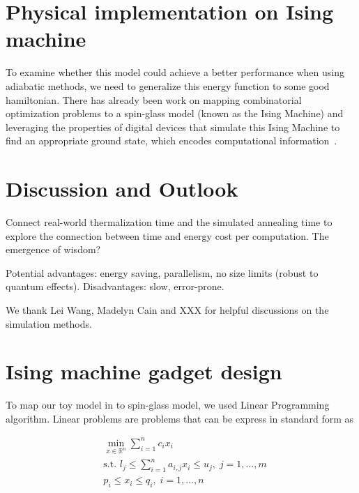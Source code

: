 \documentclass[twocolumn,superscriptaddress,english,showpacs,longbibliography]{revtex4-2}
\begin{document}
\section{Physical implementation on Ising machine}\label{spin-glass}

To examine whether this model could achieve a better performance when
using adiabatic methods, we need to generalize this energy function to
some good hamiltonian. There has already been work on mapping
combinatorial optimization problems to a spin-glass model (known as the
Ising Machine) and leveraging the properties of digital devices that
simulate this Ising Machine to find an appropriate ground state, which
encodes computational information~\cite{Aadit2022,Bybee2023}.



\section{Discussion and Outlook}
Connect real-world thermalization time and the simulated annealing time to explore the connection between time and energy cost per computation.
The emergence of wisdom?

Potential advantages: energy saving, parallelism, no size limits (robust to quantum effects). Disadvantages: slow, error-prone.

\begin{acknowledgments}
    We thank Lei Wang, Madelyn Cain and XXX for helpful discussions on the simulation methods.
\end{acknowledgments}

%


\appendix

\section{Ising machine gadget design}\label{sec:gadget-design}
To map our toy model in  to
spin-glass model, we used Linear Programming algorithm.
Linear problems are problems that can be express in standard form as

\begin{equation}
    \begin{split}
        &\min_{x \in \mathbb{R}^n} \sum_{i=1}^n c_ix_i\\
        &\text{s.t. } l_j \leq \sum_{i=1}^n a_{i,j}x_i \leq u_j, \; j=1,\ldots,m\\
        &p_i \leq x_i \leq q_i, \; i=1,\ldots, n
    \end{split}
\end{equation}
\end{document}
